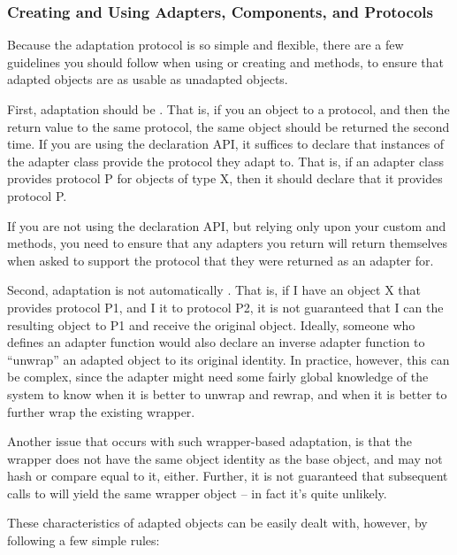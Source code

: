 \begin{verbatim%
}
\begin{verbatim%
}
\subsubsection{Creating and Using Adapters, Components, and Protocols}

Because the adaptation protocol is so simple and flexible, there are a few
guidelines you should follow when using  or creating
 and  methods, to ensure that adapted
objects are as usable as unadapted objects.

First, adaptation should be .  That is, if you
 an object to a protocol, and then  the
return value to the same protocol, the same object should be returned the
second time.  If you are using the  declaration API, it
suffices to declare that instances of the adapter class provide the protocol
they adapt to.  That is, if an adapter class provides protocol P for objects
of type X, then it should declare that it provides protocol P.

If you are not using the declaration API, but relying only upon your custom
 and  methods, you need to ensure that
any adapters you return will return themselves when asked to support the
protocol that they were returned as an adapter for.

Second, adaptation is not automatically .  That is, if I have
an object X that provides protocol P1, and I  it to protocol
P2, it is not guaranteed that I can  the resulting object to
P1 and receive the original object.  Ideally, someone who defines an adapter
function would also declare an inverse adapter function to ``unwrap'' an
adapted object to its original identity.  In practice, however, this can be
complex, since the adapter might need some fairly global knowledge of the
system to know when it is better to unwrap and rewrap, and when it is better to
further wrap the existing wrapper.

Another issue that occurs with such wrapper-based adaptation, is that the
wrapper does not have the same object identity as the base object, and may not
hash or compare equal to it, either.  Further, it is not guaranteed that
subsequent calls to  will yield the same wrapper object -- in
fact it's quite unlikely.

These characteristics of adapted objects can be easily dealt with, however, by
following a few simple rules:




\end{verbatim%
}
\end{verbatim%
}
